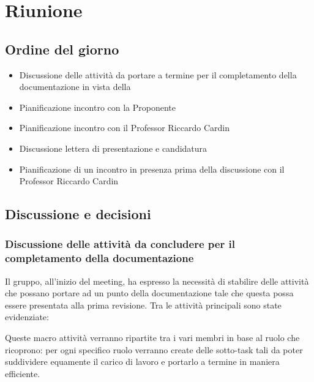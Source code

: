\section{Riunione}
\subsection{Ordine del giorno}
\begin{itemize}
	\item Discussione delle attività da portare a termine per il completamento della documentazione in vista della \RTB
	\item Pianificazione incontro con la Proponente
	\item Pianificazione incontro con il Professor Riccardo Cardin
	\item Discussione lettera di presentazione e candidatura \RTB
	\item Pianificazione di un incontro in presenza prima della discussione con il Professor Riccardo Cardin
\end{itemize}

\subsection{Discussione e decisioni}
\subsubsection{Discussione delle attività da concludere per il completamento della documentazione}
\par Il gruppo, all'inizio del meeting, ha espresso la necessità di stabilire delle attività che possano portare ad un punto della documentazione tale che questa possa essere presentata alla prima revisione. 
Tra le attività principali sono state evidenziate:
\par Queste macro attività verranno ripartite tra i vari membri in base al ruolo che ricoprono: per ogni specifico ruolo verranno create delle sotto-task tali da poter suddividere equamente il carico di lavoro e portarlo a termine in maniera efficiente.

